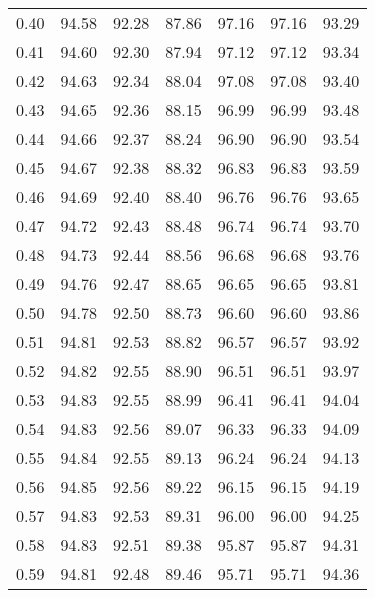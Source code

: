 \begin{tabular}{|c|c|c|c|c|c|c|}
      0.40 &     94.58 &     92.28 &      87.86 &   97.16 &      97.16 &         93.29 \\
      0.41 &     94.60 &     92.30 &      87.94 &   97.12 &      97.12 &         93.34 \\
      0.42 &     94.63 &     92.34 &      88.04 &   97.08 &      97.08 &         93.40 \\
      0.43 &     94.65 &     92.36 &      88.15 &   96.99 &      96.99 &         93.48 \\
      0.44 &     94.66 &     92.37 &      88.24 &   96.90 &      96.90 &         93.54 \\
      0.45 &     94.67 &     92.38 &      88.32 &   96.83 &      96.83 &         93.59 \\
      0.46 &     94.69 &     92.40 &      88.40 &   96.76 &      96.76 &         93.65 \\
      0.47 &     94.72 &     92.43 &      88.48 &   96.74 &      96.74 &         93.70 \\
      0.48 &     94.73 &     92.44 &      88.56 &   96.68 &      96.68 &         93.76 \\
      0.49 &     94.76 &     92.47 &      88.65 &   96.65 &      96.65 &         93.81 \\
      0.50 &     94.78 &     92.50 &      88.73 &   96.60 &      96.60 &         93.86 \\
      0.51 &     94.81 &     92.53 &      88.82 &   96.57 &      96.57 &         93.92 \\
      0.52 &     94.82 &     92.55 &      88.90 &   96.51 &      96.51 &         93.97 \\
      0.53 &     94.83 &     92.55 &      88.99 &   96.41 &      96.41 &         94.04 \\
      0.54 &     94.83 &     92.56 &      89.07 &   96.33 &      96.33 &         94.09 \\
      0.55 &     94.84 &     92.55 &      89.13 &   96.24 &      96.24 &         94.13 \\
      0.56 &     94.85 &     92.56 &      89.22 &   96.15 &      96.15 &         94.19 \\
      0.57 &     94.83 &     92.53 &      89.31 &   96.00 &      96.00 &         94.25 \\
      0.58 &     94.83 &     92.51 &      89.38 &   95.87 &      95.87 &         94.31 \\
      0.59 &     94.81 &     92.48 &      89.46 &   95.71 &      95.71 &         94.36 \\

\end{tabular}
